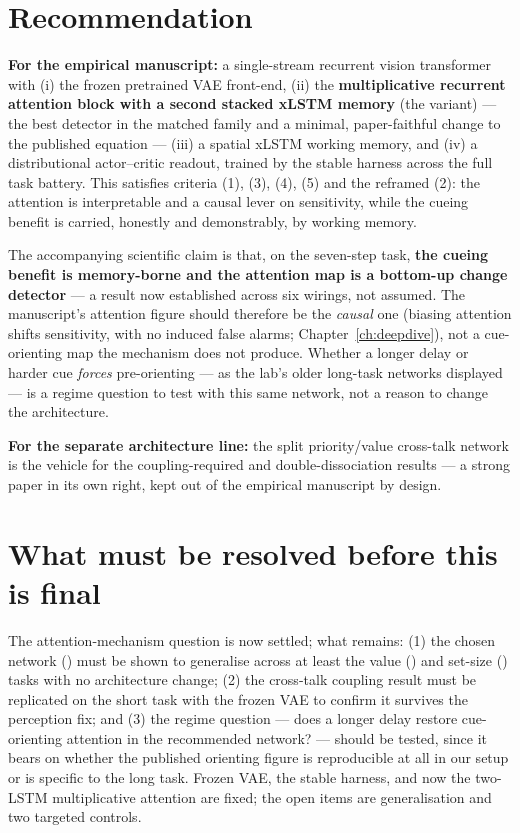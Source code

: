 \section{Recommendation}
\textbf{For the empirical manuscript:} a single-stream recurrent vision transformer with
(i) the frozen pretrained VAE front-end, (ii) the \textbf{multiplicative recurrent attention
block with a second stacked xLSTM memory} (the  variant) --- the best detector
in the matched family and a minimal, paper-faithful change to the published equation ---
(iii) a spatial xLSTM working memory, and (iv) a distributional actor--critic readout,
trained by the stable harness across the full task battery. This satisfies criteria
(1), (3), (4), (5) and the reframed (2): the attention is interpretable and a causal lever
on sensitivity, while the cueing benefit is carried, honestly and demonstrably, by working
memory.

The accompanying scientific claim is that, on the seven-step task, \textbf{the cueing
benefit is memory-borne and the attention map is a bottom-up change detector} --- a result
now established across six wirings, not assumed. The manuscript's attention figure should
therefore be the \emph{causal} one (biasing attention shifts sensitivity, with no induced
false alarms; Chapter~\ref{ch:deepdive}), not a cue-orienting map the mechanism does not
produce. Whether a longer delay or harder cue \emph{forces} pre-orienting --- as the lab's
older long-task networks displayed --- is a regime question to test with this same network,
not a reason to change the architecture.

\textbf{For the separate architecture line:} the split priority/value cross-talk network is
the vehicle for the coupling-required and double-dissociation results --- a strong paper in
its own right, kept out of the empirical manuscript by design.

\section{What must be resolved before this is final}
The attention-mechanism question is now settled; what remains: (1) the chosen network
() must be shown to generalise across at least the value () and
set-size () tasks with no architecture change; (2) the cross-talk coupling
result must be replicated on the short task with the frozen VAE to confirm it survives the
perception fix; and (3) the regime question --- does a longer delay restore cue-orienting
attention in the recommended network? --- should be tested, since it bears on whether the
published orienting figure is reproducible at all in our setup or is specific to the long
task. Frozen VAE, the stable harness, and now the two-LSTM multiplicative attention are
fixed; the open items are generalisation and two targeted controls.
